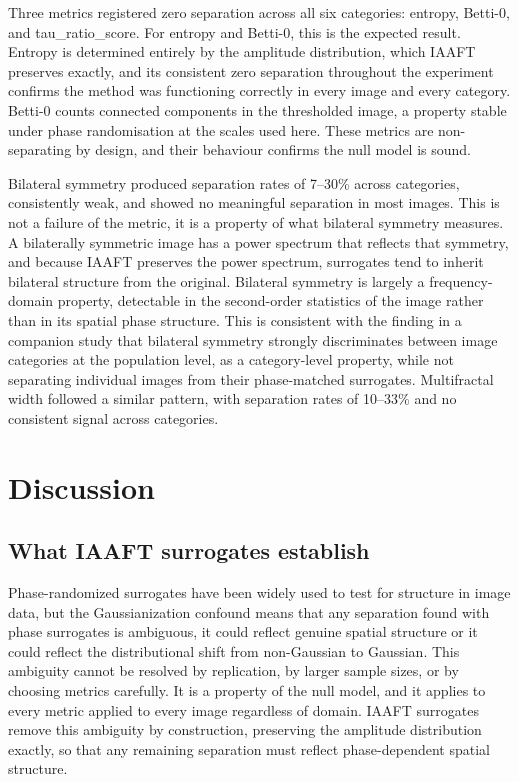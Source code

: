 \documentclass[a4paper,12pt]{article}
\begin{document}
Three metrics registered zero separation across all six categories: entropy, Betti-0, and tau\_ratio\_score. For entropy and Betti-0, this is the expected result. Entropy is determined entirely by the amplitude distribution, which IAAFT preserves exactly, and its consistent zero separation throughout the experiment confirms the method was functioning correctly in every image and every category. Betti-0 counts connected components in the thresholded image, a property stable under phase randomisation at the scales used here. These metrics are non-separating by design, and their behaviour confirms the null model is sound.

Bilateral symmetry produced separation rates of 7--30\% across categories, consistently weak, and showed no meaningful separation in most images. This is not a failure of the metric, it is a property of what bilateral symmetry measures. A bilaterally symmetric image has a power spectrum that reflects that symmetry, and because IAAFT preserves the power spectrum, surrogates tend to inherit bilateral structure from the original. Bilateral symmetry is largely a frequency-domain property, detectable in the second-order statistics of the image rather than in its spatial phase structure. This is consistent with the finding in a companion study \citep{cundill2026bilateral} that bilateral symmetry strongly discriminates between image categories at the population level, as a category-level property, while not separating individual images from their phase-matched surrogates. Multifractal width followed a similar pattern, with separation rates of 10--33\% and no consistent signal across categories.

\section{Discussion}

\subsection{What IAAFT surrogates establish}

Phase-randomized surrogates have been widely used to test for structure in image data, but the Gaussianization confound means that any separation found with phase surrogates is ambiguous, it could reflect genuine spatial structure or it could reflect the distributional shift from non-Gaussian to Gaussian. This ambiguity cannot be resolved by replication, by larger sample sizes, or by choosing metrics carefully. It is a property of the null model, and it applies to every metric applied to every image regardless of domain. IAAFT surrogates remove this ambiguity by construction, preserving the amplitude distribution exactly, so that any remaining separation must reflect phase-dependent spatial structure.
\end{document}
